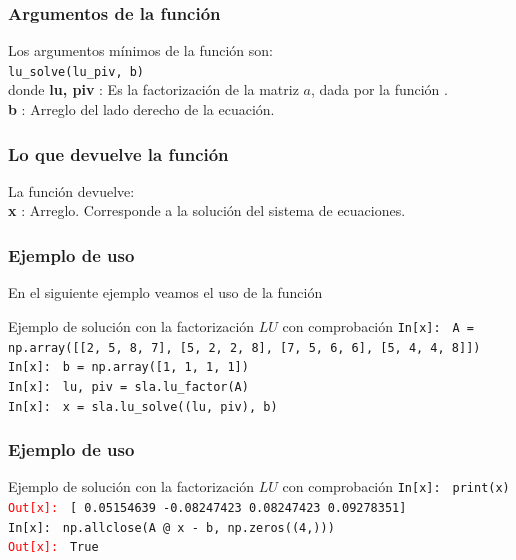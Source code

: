 \begin{frame}[fragile]
\frametitle{Argumentos de la función}
Los argumentos mínimos de la función son:
\\
\medskip
\verb|lu_solve(lu_piv, b)|
\\
\medskip
donde
\textbf{lu, piv} : Es la factorización de la matriz $a$, dada por la función .
\\
\medskip
\textbf{b} : Arreglo del lado derecho de la ecuación.
\end{frame}
\begin{frame}
\frametitle{Lo que devuelve la función}
La función devuelve:
\\
\medskip
\textbf{x} : Arreglo. Corresponde a la solución del sistema de ecuaciones.
\end{frame}
\begin{frame}[fragile]
\frametitle{Ejemplo de uso}
En el siguiente ejemplo veamos el uso de la función 
\begin{exampleblock}{Ejemplo de solución con la factorización $LU$ con comprobación}
\textcolor{ao}{\texttt{In[x]: }} \texttt{A = np.array([[2, 5, 8, 7], [5, 2, 2, 8], [7, 5, 6, 6], [5, 4, 4, 8]])} \\
\medskip
\pause
\textcolor{ao}{\texttt{In[x]: }} \texttt{b = np.array([1, 1, 1, 1])} \\
\medskip
\pause
\textcolor{ao}{\texttt{In[x]: }} \texttt{lu, piv = sla.lu\_factor(A)} \\
\medskip
\pause
\textcolor{ao}{\texttt{In[x]: }} \texttt{x = sla.lu\_solve((lu, piv), b)} \\
\end{exampleblock}
\end{frame}
\begin{frame}[fragile]
\frametitle{Ejemplo de uso}
\begin{exampleblock}{Ejemplo de solución con la factorización $LU$ con comprobación}
\textcolor{ao}{\texttt{In[x]: }} \texttt{print(x)} \\
\medskip
\pause
\textcolor{red}{\texttt{Out[x]: }} \texttt{[ 0.05154639 -0.08247423  0.08247423  0.09278351]}
\\
\medskip
\pause
\textcolor{ao}{\texttt{In[x]: }} \texttt{np.allclose(A @ x - b, np.zeros((4,)))} \\
\medskip
\pause
\textcolor{red}{\texttt{Out[x]: }} \texttt{True}
\end{exampleblock}
\end{frame}
